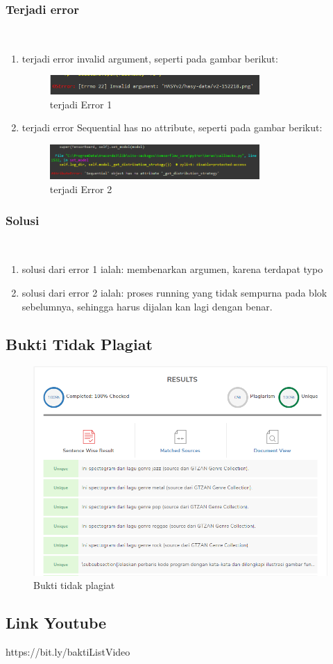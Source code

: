 \subsubsection{Terjadi error}
\hfill\\
\begin{enumerate}
\item terjadi error invalid argument, seperti pada gambar berikut:
\begin{figure}[H]
	\centering
	\includegraphics[width=8cm]{figures/1174083/figures7/error1.png}
	\caption{terjadi Error 1}
\end{figure}

\item terjadi error Sequential has no attribute, seperti pada gambar berikut:
\begin{figure}[H]
	\centering
	\includegraphics[width=8cm]{figures/1174083/figures7/error2.png}
	\caption{terjadi Error 2}
\end{figure}
\end{enumerate}

\subsubsection{Solusi}
\hfill\\
\begin{enumerate}
\item solusi dari error 1 ialah:
membenarkan argumen, karena terdapat typo

\item solusi dari error 2 ialah:
proses running yang tidak sempurna pada blok sebelumnya, sehingga harus dijalan kan lagi dengan benar.

\end{enumerate}

\subsection{Bukti Tidak Plagiat}
\begin{figure}[H]
	\centering
	\includegraphics[width=12cm]{figures/1174083/figures7/plagiarism.png}
	\caption{Bukti tidak plagiat}
\end{figure}

\subsection{Link Youtube}
https://bit.ly/baktiListVideo